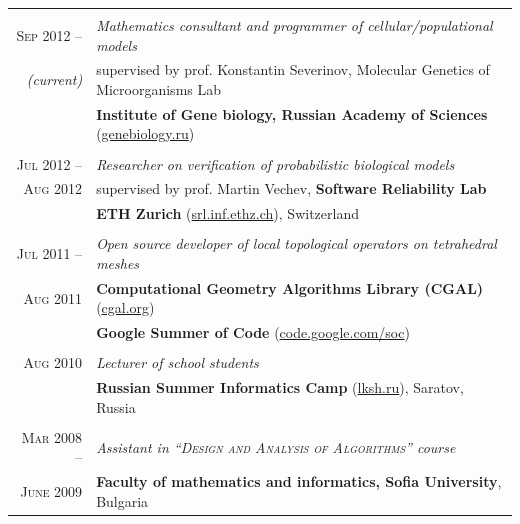 \documentclass[a4paper,10pt]{article}
\def\myline{\color{linegray}\vline}
\begin{document}
{\begin{tabular}{r!{\myline}p{14cm}}
        \\
	\textsc{Sep 2012 --}      &  \textit{Mathematics consultant and programmer of cellular/populational models}\\
        \small\textit{(current)}  &  supervised by prof. Konstantin Severinov, Molecular Genetics of Microorganisms Lab\\
                                  &  \textbf{Institute of Gene biology, Russian Academy of Sciences} (\href{http://www.genebiology.ru/}{genebiology.ru})\\
	
        \\
	\textsc{Jul 2012 --}      &  \textit{Researcher on verification of probabilistic biological models}\\
        \textsc{Aug 2012} &  supervised by prof. Martin Vechev, \textbf{Software Reliability Lab}\\
                                  &  \textbf{ETH Zurich} (\href{http://www.srl.inf.ethz.ch/}{srl.inf.ethz.ch}), Switzerland\\
	
        \\
	\textsc{Jul 2011 --}      &  \textit{Open source developer of local topological operators on tetrahedral meshes}\\
	\textsc{Aug 2011}         &  \textbf{Computational Geometry Algorithms Library (CGAL)} (\href{http://www.cgal.org/}{cgal.org})\\
                                  &  \textbf{Google Summer of Code} (\href{http://code.google.com/soc/}{code.google.com/soc})\\
	
        \\
	\textsc{Aug 2010}         &  \textit{Lecturer of school students}\\
	                          &  \textbf{Russian Summer Informatics Camp} (\href{http://lksh.ru/}{lksh.ru}), Saratov, Russia\vspace{-5mm}\\
	
	\\
	\textsc{Mar 2008 --}      &  \textit{Assistant in \textsc{``Design and Analysis of Algorithms''} course}\\
	\textsc{June 2009}        &  \textbf{Faculty of mathematics and informatics, Sofia University}, Bulgaria\\


\end{tabular}}
\end{document}
